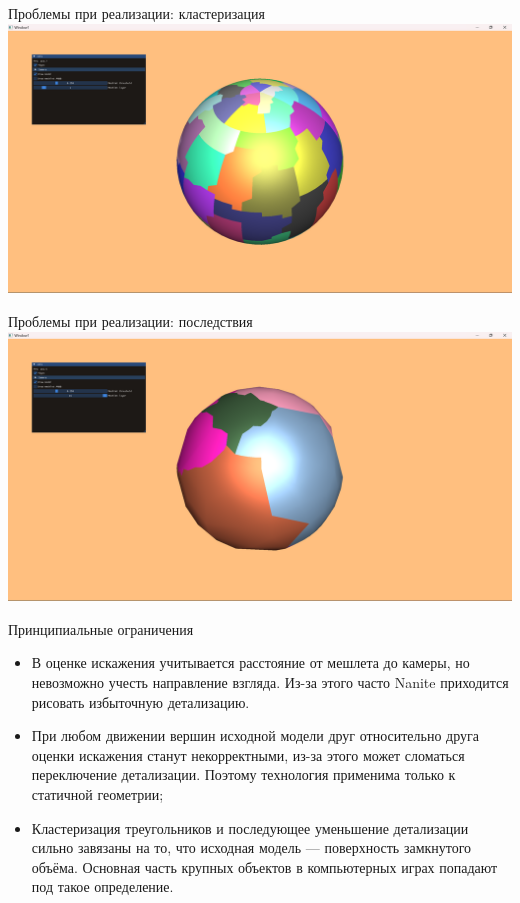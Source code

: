 \documentclass{beamer}
\begin{document}
    \begin{frame}{Проблемы при реализации: кластеризация}
        \includegraphics[width=\textwidth]{sphere0.png}
    \end{frame}

    \begin{frame}{Проблемы при реализации: последствия}
        \includegraphics[width=\textwidth]{sphere1.png}
    \end{frame}

    \begin{frame}{Принципиальные ограничения}
        \begin{itemize}
            \item
            В оценке искажения учитывается расстояние
            от мешлета до камеры,
            но невозможно учесть направление взгляда.
            Из-за этого часто Nanite приходится
            рисовать избыточную детализацию.

            \item
            При любом движении вершин исходной модели
            друг относительно друга оценки искажения
            станут некорректными, из-за этого
            может сломаться переключение детализации.
            Поэтому технология применима только
            к статичной геометрии;

            \item
            Кластеризация треугольников и последующее уменьшение
            детализации сильно завязаны на то,
            что исходная модель --- поверхность замкнутого объёма.
            Основная часть крупных объектов в компьютерных играх
            попадают под такое определение.
        \end{itemize}
    \end{frame}
\end{document}
